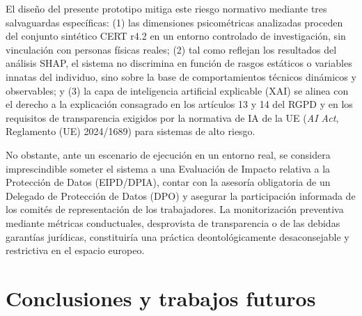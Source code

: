 \documentclass[IB]{TFUOC}%
\begin{document}
\medskip
\noindent El diseño del presente prototipo mitiga este riesgo normativo mediante tres salvaguardas específicas: (1) las dimensiones psicométricas analizadas proceden del conjunto sintético CERT r4.2 en un entorno controlado de investigación, sin vinculación con personas físicas reales; (2) tal como reflejan los resultados del análisis SHAP, el sistema no discrimina en función de rasgos estáticos o variables innatas del individuo, sino sobre la base de comportamientos técnicos dinámicos y observables; y (3) la capa de inteligencia artificial explicable (XAI) se alinea con el derecho a la explicación consagrado en los artículos 13 y 14 del RGPD y en los requisitos de transparencia exigidos por la normativa de IA de la UE (\textit{AI Act}, Reglamento (UE) 2024/1689) para sistemas de alto riesgo.

\medskip
\noindent No obstante, ante un escenario de ejecución en un entorno real, se considera imprescindible someter el sistema a una Evaluación de Impacto relativa a la Protección de Datos (EIPD/DPIA), contar con la asesoría obligatoria de un Delegado de Protección de Datos (DPO) y asegurar la participación informada de los comités de representación de los trabajadores. La monitorización preventiva mediante métricas conductuales, desprovista de transparencia o de las debidas garantías jurídicas, constituiría una práctica deontológicamente desaconsejable y restrictiva en el espacio europeo.





\chapter{Conclusiones y trabajos futuros}
\end{document}
